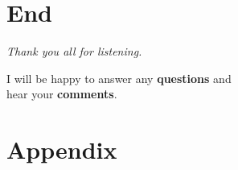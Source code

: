 \section{End}

\begin{frame}[c]
	\centering %
	\begin{huge}
		\emph{Thank you all for listening.}\\
	\end{huge}
	\vspace{2 cm}
	I will be happy to answer any \textbf{questions} and\\
	hear your \textbf{comments}.
\end{frame}

\appendix
\section{Appendix}

